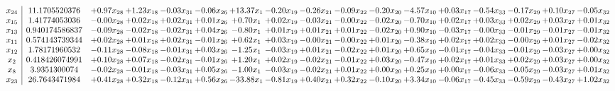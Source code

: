 \documentclass[9pt]{article}
\begin{document}
 \[\begin{array}{c| c c@{\hskip 2pt} c@{\hskip 2pt} c@{\hskip 2pt} c@{\hskip 2pt} c@{\hskip 2pt} c@{\hskip 2pt} c@{\hskip 2pt} c@{\hskip 2pt} c@{\hskip 2pt} c@{\hskip 2pt} c@{\hskip 2pt} c@{\hskip 2pt} c@{\hskip 2pt} c@{\hskip 2pt} c@{\hskip 2pt} }
 x_{24}   &  11.1705520376 & +  0.97 x_{28} & +  1.23 x_{18} & -0.03 x_{31} & -0.06 x_{26} & + 13.37 x_{1} & -0.20 x_{19} & -0.26 x_{21} & -0.09 x_{22} & -0.20 x_{20} & -4.57 x_{10} & +  0.03 x_{17} & -0.54 x_{33} & -0.17 x_{29} & +  0.10 x_{27} & -0.05 x_{32}\\
 x_{15}   &  1.41774053036 & -0.00 x_{28} & +  0.02 x_{18} & +  0.02 x_{31} & +  0.01 x_{26} & +  0.70 x_{1} & +  0.02 x_{19} & -0.03 x_{21} & -0.00 x_{22} & -0.02 x_{20} & -0.70 x_{10} & +  0.02 x_{17} & +  0.03 x_{33} & +  0.02 x_{29} & +  0.03 x_{27} & +  0.01 x_{32}\\
 x_{13}   &  0.940174586837 & -0.09 x_{28} & -0.02 x_{18} & -0.02 x_{31} & +  0.04 x_{26} & -0.80 x_{1} & +  0.01 x_{19} & +  0.01 x_{21} & +  0.01 x_{22} & -0.02 x_{20} & +  0.90 x_{10} & -0.03 x_{17} & -0.00 x_{33} & -0.01 x_{29} & -0.01 x_{27} & -0.01 x_{32}\\
 x_{11}   &  0.574143739344 & +  0.02 x_{28} & +  0.01 x_{18} & +  0.02 x_{31} & -0.01 x_{26} & +  0.62 x_{1} & +  0.03 x_{19} & -0.00 x_{21} & -0.00 x_{22} & +  0.01 x_{20} & -0.38 x_{10} & +  0.02 x_{17} & +  0.02 x_{33} & -0.00 x_{29} & +  0.01 x_{27} & -0.02 x_{32}\\
 x_{12}   &  1.78171960532 & -0.11 x_{28} & -0.08 x_{18} & -0.01 x_{31} & +  0.03 x_{26} & -1.25 x_{1} & -0.03 x_{19} & +  0.01 x_{21} & -0.02 x_{22} & +  0.01 x_{20} & +  0.65 x_{10} & -0.01 x_{17} & -0.04 x_{33} & -0.01 x_{29} & -0.03 x_{27} & +  0.00 x_{32}\\
 x_{2}   &  0.418426074991 & +  0.10 x_{28} & +  0.07 x_{18} & -0.02 x_{31} & -0.01 x_{26} & +  1.20 x_{1} & +  0.02 x_{19} & -0.02 x_{21} & -0.01 x_{22} & +  0.03 x_{20} & -0.47 x_{10} & +  0.02 x_{17} & +  0.01 x_{33} & +  0.02 x_{29} & +  0.03 x_{27} & +  0.00 x_{32}\\
 x_{8}   &  3.9351300074 & -0.02 x_{28} & -0.01 x_{18} & -0.03 x_{31} & +  0.05 x_{26} & -1.00 x_{1} & -0.03 x_{19} & -0.02 x_{21} & +  0.01 x_{22} & +  0.00 x_{20} & +  0.25 x_{10} & +  0.00 x_{17} & -0.06 x_{33} & -0.05 x_{29} & -0.03 x_{27} & +  0.01 x_{32}\\
 x_{23}   &  26.7643471984 & +  0.41 x_{28} & +  0.32 x_{18} & -0.12 x_{31} & +  0.56 x_{26} & -33.88 x_{1} & -0.81 x_{19} & +  0.40 x_{21} & +  0.32 x_{22} & -0.10 x_{20} & +  3.34 x_{10} & -0.06 x_{17} & -0.45 x_{33} & -0.59 x_{29} & -0.43 x_{27} & +  1.02 x_{32}\\

\end{array}\]
\end{document}
